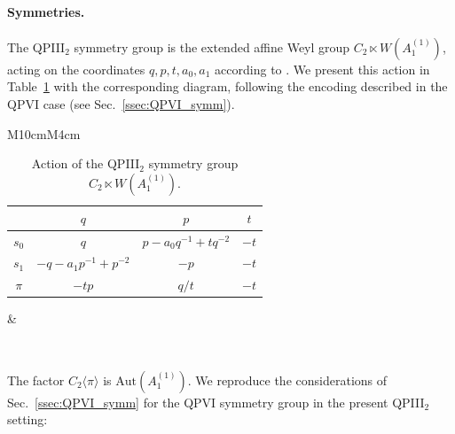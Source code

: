\documentclass[12pt,a4paper]{article}
\numberwithin{equation}{section}
\begin{document}
\paragraph{Symmetries.}
The QPIII$_2$ symmetry group is the extended affine Weyl group $C_2 \ltimes W\left(A_1^{(1)}\right)$, acting on the coordinates $q,p,t,a_0,a_1$ according to \cite[Definition 2.21]{NY12}. We present this action in Table~\ref{table:QPIII2_Backlund} with the corresponding diagram, following the encoding described in the QPVI case (see Sec.~\ref{ssec:QPVI_symm}).
\begin{table}[H]
\begin{tabular}{M{10cm}M{4cm}}
\begin{tabular}{ |c|c|c|c|} 
\hline
 & $q$ & $p$ & $t$ \\
\hline
\hline
 $s_0$ & $q$ & $p - a_0 q^{-1} + tq^{-2}$ & $-t$\\  
 \hline
 $s_1$ & $-q-a_1p^{-1}+p^{-2}$ & $-p$ & $-t$\\  
 \hline
 $\pi$ & $-tp$ & $q/t$ & $-t$ \\
 \hline

\end{tabular}
&
			\\

\end{tabular}
\caption{Action of the QPIII$_2$ symmetry group  $C_2\ltimes W(A_1^{(1)})$.}
\label{table:QPIII2_Backlund}
\end{table}
The factor $C_2\langle\pi\rangle$ is $\mathrm{Aut}\left(A_1^{(1)}\right)$.
We reproduce the considerations of Sec.~\ref{ssec:QPVI_symm} for the QPVI symmetry group in the present QPIII$_2$ setting: 
\end{document}
